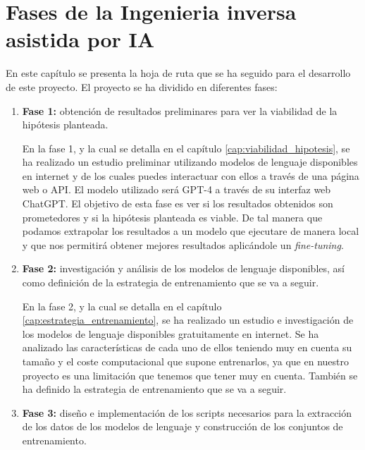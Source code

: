 \chapter{Fases de la Ingenieria inversa asistida por IA}
\label{cap:hoja_de_ruta}


En este capítulo se presenta la hoja de ruta que se ha seguido para el desarrollo de
este proyecto. El proyecto se ha dividido en diferentes fases:

\begin{enumerate}
    \item \textbf{Fase 1:} obtención de resultados preliminares para ver la viabilidad 
        de la hipótesis planteada.

        En la fase 1, y la cual se detalla en el capítulo \ref{cap:viabilidad_hipotesis},
        se ha realizado un estudio preliminar utilizando modelos de lenguaje
        disponibles en internet y de los cuales puedes interactuar con ellos a través de
        una página web o API. El modelo utilizado será GPT-4 a través de su interfaz web
        ChatGPT. El objetivo de esta fase es ver si los resultados obtenidos son prometedores
        y si la hipótesis planteada es viable. De tal manera que podamos extrapolar los resultados
        a un modelo que ejecutare de manera local y que nos permitirá obtener mejores resultados
        aplicándole un \textit{fine-tuning}.

    \item \textbf{Fase 2:} investigación y análisis de los modelos de lenguaje disponibles,
        así como definición de la estrategia de entrenamiento que se va a seguir.
        
        En la fase 2, y la cual se detalla en el capítulo \ref{cap:estrategia_entrenamiento},
        se ha realizado un estudio e investigación de los modelos de lenguaje disponibles
        gratuitamente en internet. Se ha analizado las características de cada uno de ellos
        teniendo muy en cuenta su tamaño y el coste computacional que supone entrenarlos, ya que
        en nuestro proyecto es una limitación que tenemos que tener muy en cuenta. También se ha
        definido la estrategia de entrenamiento que se va a seguir.

    \item \textbf{Fase 3:} diseño e implementación de los scripts necesarios para la
        extracción de los datos de los modelos de lenguaje y construcción de los
        conjuntos de entrenamiento.
        

\end{enumerate}
